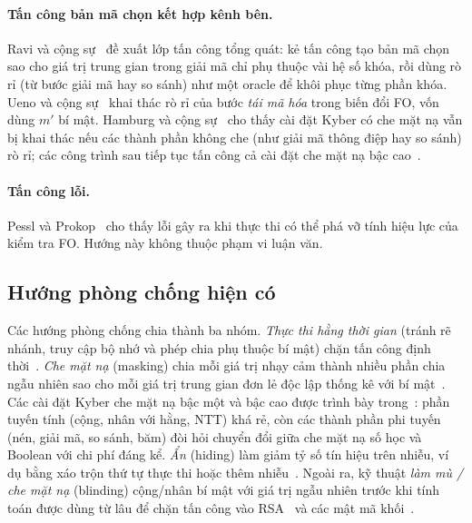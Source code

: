 \documentclass[../LuanVan.tex]{subfiles}
\begin{document}
\paragraph{Tấn công bản mã chọn kết hợp kênh bên.} Ravi và cộng sự~\cite{Ravi20} đề xuất lớp tấn công tổng quát: kẻ tấn công tạo bản mã chọn sao cho giá trị trung gian trong giải mã chỉ phụ thuộc vài hệ số khóa, rồi dùng rò rỉ (từ bước giải mã hay so sánh) như một oracle để khôi phục từng phần khóa. Ueno và cộng sự~\cite{Ueno22} khai thác rò rỉ của bước \emph{tái mã hóa} trong biến đổi FO, vốn dùng $m'$ bí mật. Hamburg và cộng sự~\cite{Hamburg21} cho thấy cài đặt Kyber có che mặt nạ vẫn bị khai thác nếu các thành phần không che (như giải mã thông điệp hay so sánh) rò rỉ; các công trình sau tiếp tục tấn công cả cài đặt che mặt nạ bậc cao~\cite{Dubrova23,wang2023bitsliced}.
 
\paragraph{Tấn công lỗi.} Pessl và Prokop~\cite{PesslProkop21} cho thấy lỗi gây ra khi thực thi có thể phá vỡ tính hiệu lực của kiểm tra FO. Hướng này không thuộc phạm vi luận văn.
 
\subsection{Hướng phòng chống hiện có}
 
Các hướng phòng chống chia thành ba nhóm.
\emph{Thực thi hằng thời gian} (tránh rẽ nhánh, truy cập bộ nhớ và phép chia phụ thuộc bí mật) chặn tấn công định thời~\cite{KyberSlash24}.
\emph{Che mặt nạ} (masking) chia mỗi giá trị nhạy cảm thành nhiều phần chia ngẫu nhiên sao cho mỗi giá trị trung gian đơn lẻ độc lập thống kê với bí mật~\cite{ChariJRR99,ISW03}. Các cài đặt Kyber che mặt nạ bậc một và bậc cao được trình bày trong~\cite{Bos21,Heinz22}: phần tuyến tính (cộng, nhân với hằng, NTT) khá rẻ, còn các thành phần phi tuyến (nén, giải mã, so sánh, băm) đòi hỏi chuyển đổi giữa che mặt nạ số học và Boolean với chi phí đáng kể.
\emph{Ẩn} (hiding) làm giảm tỷ số tín hiệu trên nhiễu, ví dụ bằng xáo trộn thứ tự thực thi hoặc thêm nhiễu~\cite{MangardOP07}.
Ngoài ra, kỹ thuật \emph{làm mù / che mặt nạ} (blinding) cộng/nhân bí mật với giá trị ngẫu nhiên trước khi tính toán được dùng từ lâu để chặn tấn công vào RSA~\cite{Kocher96} và các mật mã khối~\cite{messerges2000}.
 
\end{document}
